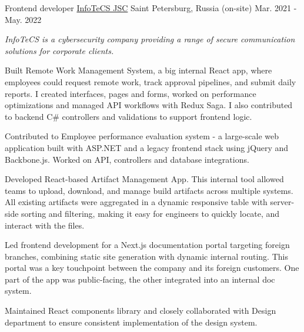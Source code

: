\begin{cventries}
  \cventry
    {Frontend developer} %
    {\href{https://infotecs.ru/}{InfoTeCS JSC}}
    {Saint Petersburg, Russia (on-site)} %
    {Mar. 2021 - May. 2022} %
    {
      \begin{cvitems} %
      \vspace{8pt}
      \item[] {\small\textit{InfoTeCS is a cybersecurity company providing a range of secure communication solutions for corporate clients.}}
      \vspace{8pt}
        \item {Built Remote Work Management System, a big internal React app, where employees could request remote work, track approval pipelines, and submit daily reports. I created interfaces, pages and forms, worked on performance optimizations and managed API workflows with Redux Saga. I also contributed to backend C\# controllers and validations to support frontend logic. }
        \item {Contributed to Employee performance evaluation system - a large-scale web application built with ASP.NET and a legacy frontend stack using jQuery and Backbone.js. Worked on API, controllers and database integrations.}
        \item {Developed React-based Artifact Management App. This internal tool allowed teams to upload, download, and manage build artifacts across multiple systems. All existing artifacts were aggregated in a dynamic responsive table with server-side sorting and filtering, making it easy for engineers to quickly locate, and interact with the files.}
        \item {Led frontend development for a Next.js documentation portal targeting foreign branches, combining static site generation with dynamic internal routing. This portal was a key touchpoint between the company and its foreign customers. One part of the app was public-facing, the other integrated into an internal doc system.}
        \item {Maintained React components library and closely collaborated with Design department to ensure consistent implementation of the design system.}
      \end{cvitems}
    }
    {\vspace{16pt}}


\end{cventries}
